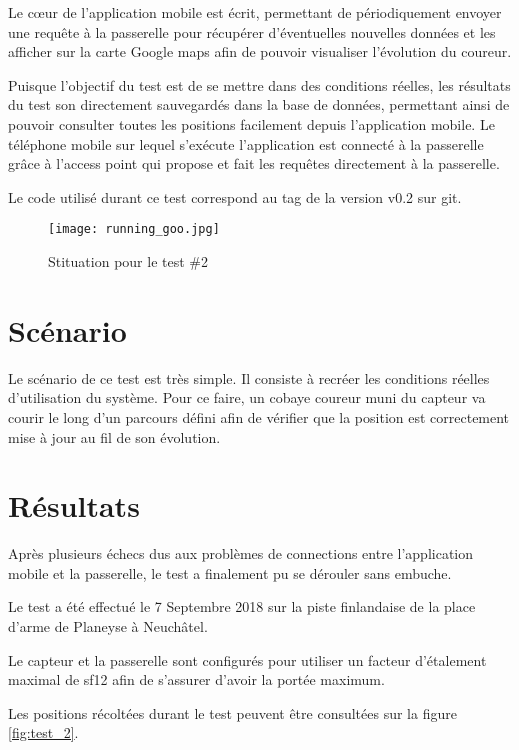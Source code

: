 Le cœur de l'application mobile est écrit, permettant de périodiquement envoyer une requête à la passerelle pour récupérer d'éventuelles nouvelles données et les afficher sur la carte Google maps afin de pouvoir visualiser l'évolution du coureur.

Puisque l'objectif du test est de se mettre dans des conditions réelles, les résultats du test son directement sauvegardés dans la base de données, permettant ainsi de pouvoir consulter toutes les positions facilement depuis l'application mobile. Le téléphone mobile sur lequel s'exécute l'application est connecté à la passerelle grâce à l'access point qui propose et fait les requêtes directement à la passerelle.

Le code utilisé durant ce test correspond au tag de la version v0.2 sur git.

\begin{figure}[htb]
\centering 
\texttt{[image: running\_goo.jpg]} 
\caption{Stituation pour le test \#2}
\label{fig:situation_test_2}
\end{figure}

\section{Scénario}

Le scénario de ce test est très simple. Il consiste à recréer les conditions réelles d'utilisation du système. Pour ce faire, un cobaye coureur muni du capteur va courir le long d'un parcours défini afin de vérifier que la position est correctement mise à jour au fil de son évolution.

\section{Résultats}

Après plusieurs échecs dus aux problèmes de connections entre l'application mobile et la passerelle, le test a finalement pu se dérouler sans embuche.

Le test a été effectué le 7 Septembre 2018 sur la piste finlandaise de la place d'arme de Planeyse à Neuchâtel.

Le capteur et la passerelle sont configurés pour utiliser un facteur d'étalement maximal de sf12 afin de s'assurer d'avoir la portée maximum.

Les positions récoltées durant le test peuvent être consultées sur la figure \ref{fig:test_2}.

